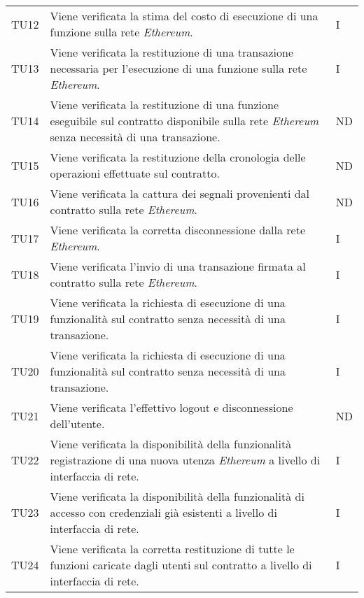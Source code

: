 \begin{longtable}{|C{1.5cm}|C{10cm}|C{1.5cm}|}
	TU12 &
	Viene verificata la stima del costo di esecuzione di una funzione sulla rete \textit{Ethereum\glos}.  &
	I \\

	TU13 &
	Viene verificata la restituzione di una transazione necessaria per l'esecuzione di una funzione sulla rete \textit{Ethereum\glo}.  &
	I \\

	TU14 &
	Viene verificata la restituzione di una funzione eseguibile sul contratto disponibile sulla rete \textit{Ethereum\glo} senza necessità di una transazione.  &
	ND \\

	TU15 &
	Viene verificata la restituzione della cronologia delle operazioni effettuate sul contratto.  &
	ND \\

	TU16 &
	Viene verificata la cattura dei segnali provenienti dal contratto sulla rete \textit{Ethereum\glos}.  &
	ND \\

	TU17 &
	Viene verificata la corretta disconnessione dalla rete \textit{Ethereum\glos}.  &
	I \\

	TU18 &
	Viene verificata l'invio di una transazione firmata al contratto sulla rete \textit{Ethereum\glos}.  &
	I \\

	TU19 &
	Viene verificata la richiesta di esecuzione di una funzionalità sul contratto senza necessità di una transazione.  &
	I \\

	TU20 &
	Viene verificata la richiesta di esecuzione di una funzionalità sul contratto senza necessità di una transazione.  &
	I \\

	TU21 &
	Viene verificata l'effettivo logout e disconnessione dell'utente.  &
	ND \\

	TU22 &
	Viene verificata la disponibilità della funzionalità registrazione di una nuova utenza \textit{Ethereum\glo} a livello di interfaccia di rete.  &
	I \\

	TU23 &
	Viene verificata la disponibilità della funzionalità di accesso con credenziali già esistenti a livello di interfaccia di rete.  &
	I \\

	TU24 &
	Viene verificata la corretta restituzione di tutte le funzioni caricate dagli utenti sul contratto a livello di interfaccia di rete.  &
	I \\


\end{longtable}

